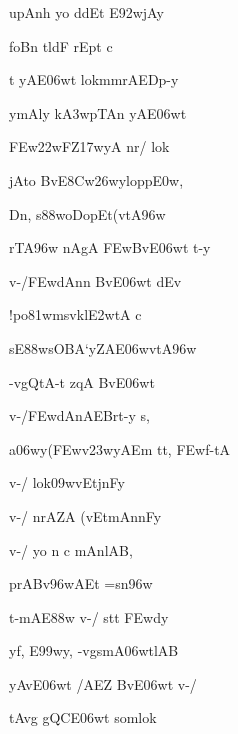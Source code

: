 \dnnemslokac 
{\dn upAnh\2 yo ddEt E\392wjAy}
\dontdisplaylinenum

\dnnemslokad 
{\dn {}foBn\2 t\4ldF rEpt\2 c \vegdn\dontdisplaylinenum}


\ujvers\dnnemsloka 
{\dn t\? yAE\306wt lokmmrAEDp-y}
\dontdisplaylinenum

\dnnemslokab 
{\dn ymAly\2 k\3A3wpTAn yAE\306wt \dandadn\dontdisplaylinenum}

\dnnemslokac 
{\dn \3FEw\322wFZ\317wyA nr/ lok\?}
\dontdisplaylinenum

\dnnemslokad 
{\dn jAto Bv\?E\38Cw\326wylopp\3E0w, \vegdn\dontdisplaylinenum}


\ujvers\dnnemsloka 
{\dn Dn\4, s\388woDopEt(vtA\396w}
\dontdisplaylinenum

\dnnemslokab 
{\dn rTA\396w nAgA \3FEwBvE\306wt t-y \dandadn\dontdisplaylinenum}

\dnnemslokac 
{\dn v-/\3FEwdAn\?n BvE\306wt d\?Ev}
\dontdisplaylinenum

\dnnemslokad 
{\dn !po\381wmsv\0kl\3E2wtA\2 c \vegdn\dontdisplaylinenum}


\ujvers\dnnemsloka 
{\dn sE\388wsOBA`yZAE\306wvtA\396w}
\dontdisplaylinenum

\dnnemslokab 
{\dn -vg\0QtA-t\? zqA BvE\306wt \dandadn\dontdisplaylinenum}

\dnnemslokac 
{\dn v-/\3FEwdAnAEBrt-y \2s,}
\dontdisplaylinenum

\dnnemslokad 
{\dn a\306wy(\3FEwv\323wyAEm tt, \3FEwf-tA \vegdn\dontdisplaylinenum}


\ujvers\dnnemsloka 
{\dn v-/\2  lok\?\309wvEtjnFy}
\dontdisplaylinenum

\dnnemslokab 
{\dn v-/\2 nrAZA\2 (vEtmAnnFy \dandadn\dontdisplaylinenum}

\dnnemslokac 
{\dn v-/\2  yo n c mAnlAB,}
\dontdisplaylinenum

\dnnemslokad 
{\dn prABv\396wAEt =sn\396w \vegdn\dontdisplaylinenum}


\ujvers\dnnemsloka 
{\dn t-mAE\388w v-/\2 stt\2 \3FEwd\?y}
\dontdisplaylinenum

\dnnemslokab 
{\dn yf, E\399wy, -vg\0smA\306wtlAB \dandadn\dontdisplaylinenum}

\dnnemslokac 
{\dn yAvE\306wt /AEZ BvE\306wt v-/\?}
\dontdisplaylinenum

\dnnemslokad 
{\dn tAvg\2 gQCE\306wt somlok \vegdn\dontdisplaylinenum}


